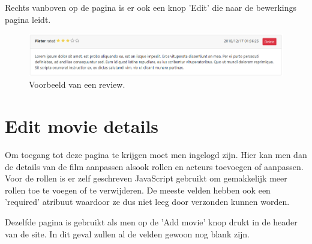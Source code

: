 \documentclass[12px]{article}
\begin{document}
Rechts vanboven op de pagina is er ook een knop 'Edit' die naar de bewerkings pagina leidt.
\begin{figure}[!hbp]
\includegraphics[width=\textwidth]{review}
\caption{Voorbeeld van een review.}
\end{figure}
\FloatBarrier

\section{Edit movie details}
Om toegang tot deze pagina te krijgen moet men ingelogd zijn. Hier kan men dan de details van de film aanpassen alsook rollen en acteurs toevoegen of aanpassen. Voor de rollen is er zelf geschreven JavaScript gebruikt om gemakkelijk meer rollen toe te voegen of te verwijderen. De meeste velden hebben ook een 'required' atribuut waardoor ze dus niet leeg door verzonden kunnen worden.

Dezelfde pagina is gebruikt als men op de 'Add movie' knop drukt in de header van de site. In dit geval zullen al de velden gewoon nog blank zijn.
\end{document}
